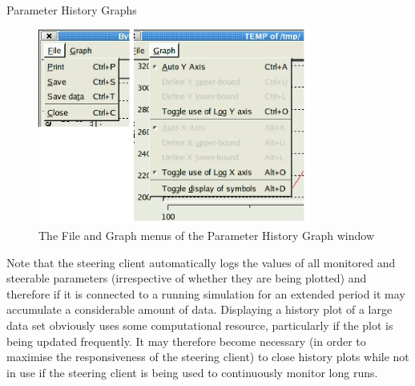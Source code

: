 \documentclass[a4paper,twoside]{article}
\begin{document}
\begin{section}{Parameter History Graphs}
\begin{figure}
\centerline{\includegraphics[width=9cm]{hist_plot_menus.eps}}
\caption{The File and Graph menus of the Parameter History Graph window}
\label{fig:param_hist_menus}
\end{figure}

Note that the steering client automatically logs the values of all
monitored and steerable parameters (irrespective of whether they are
being plotted) and therefore if it is connected to a running
simulation for an extended period it may accumulate a considerable
amount of data.  Displaying a history plot of a large data set
obviously uses some computational resource, particularly if the plot
is being updated frequently.  It may therefore become necessary (in order to
maximise the responsiveness of the steering client) to close history plots
while not in use if the steering client is being used to
continuously monitor long runs.

\end{section} %

\end{document}
